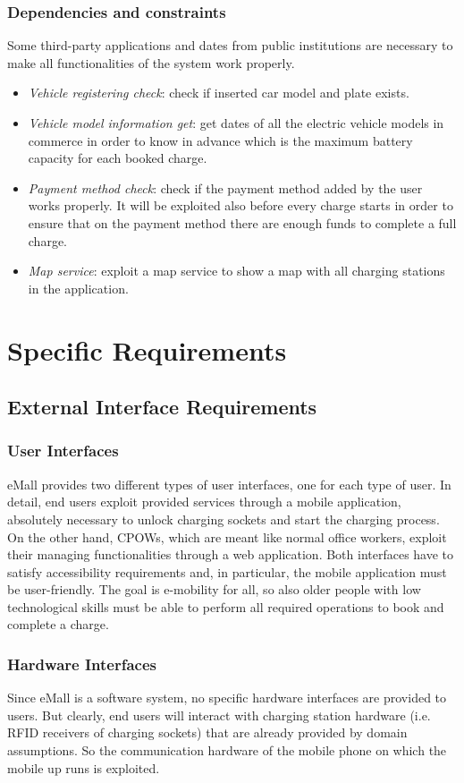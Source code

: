 \documentclass[a4paper]{report}
\begin{document}
\subsection{Dependencies and constraints}
Some third-party applications and dates from public institutions are necessary to make all functionalities of the system work properly.
\begin{itemize}
    \item \textit{Vehicle registering check}: check if inserted car model and plate exists.
    \item \textit{Vehicle model information get}: get dates of all the electric vehicle models in commerce in order to know in advance which is the maximum battery capacity for each booked charge.
    \item \textit{Payment method check}: check if the payment method added by the user works properly. It will be exploited also before every charge starts in order to ensure that on the payment method there are enough funds to complete a full charge.
    \item \textit{Map service}: exploit a map service to show a map with all charging stations in the application.
\end{itemize}

\chapter{Specific Requirements}
\section{External Interface Requirements}
\subsection{User Interfaces}
eMall provides two different types of user interfaces, one for each type of user. In detail, end users exploit provided services through a mobile application, absolutely necessary to unlock charging sockets and start the charging process. On the other hand, CPOWs, which are meant like normal office workers, exploit their managing functionalities through a web application. Both interfaces have to satisfy accessibility requirements and, in particular, the mobile application must be user-friendly. The goal is e-mobility for all, so also older people with low technological skills must be able to perform all required operations to book and complete a charge.
\subsection{Hardware Interfaces}
Since eMall is a software system, no specific hardware interfaces are provided to users. But clearly, end users will interact with charging station hardware (i.e. RFID receivers of charging sockets) that are already provided by domain assumptions. So the communication hardware of the mobile phone on which the mobile up runs is exploited.
\end{document}
